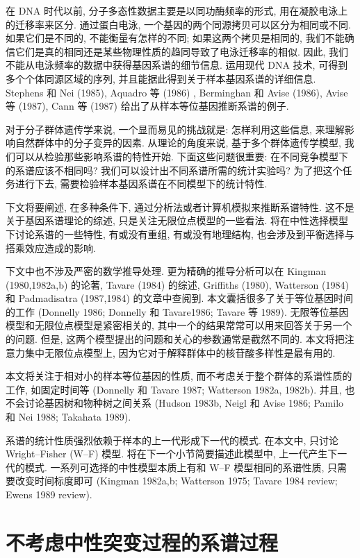 \documentclass[12pt]{article}
\begin{document}
在 DNA 时代以前, 分子多态性数据主要是以同功酶频率的形式, 用在凝胶电泳上的迁移率来区分. 通过蛋白电泳,
一个基因的两个同源拷贝可以区分为相同或不同. 如果它们是不同的, 不能衡量有怎样的不同; 如果这两个拷贝是相同的,
我们不能确信它们是真的相同还是某些物理性质的趋同导致了电泳迁移率的相似. 因此,
我们不能从电泳频率的数据中获得基因系谱的细节信息. 运用现代 DNA 技术, 可得到多个个体同源区域的序列,
并且能据此得到关于样本基因系谱的详细信息. Stephens 和 Nei (1985), Aquadro 等 (1986) , Berminghan 和 Avise
(1986), Avise 等 (1987), Cann 等 (1987) 给出了从样本等位基因推断系谱的例子.

对于分子群体遗传学来说, 一个显而易见的挑战就是: 怎样利用这些信息, 来理解影响自然群体中的分子变异的因素. 从理论的角度来说,
基于多个群体遗传学模型, 我们可以从检验那些影响系谱的特性开始. 下面这些问题很重要: 在不同竞争模型下的系谱应该不相同吗?
我们可以设计出不同系谱所需的统计实验吗? 为了把这个任务进行下去, 需要检验样本基因系谱在不同模型下的统计特性.

下文将要阐述, 在多种条件下, 通过分析法或者计算机模拟来推断系谱特性. 这不是关于基因系谱理论的综述, 只是关注无限位点模型的一些看法.
将在中性选择模型下讨论系谱的一些特性, 有或没有重组, 有或没有地理结构, 也会涉及到平衡选择与搭乘效应造成的影响.

下文中也不涉及严密的数学推导处理. 更为精确的推导分析可以在 Kingman (1980,1982a,b) 的论著, Tavare (1984) 的综述,
Griffiths (1980), Watterson (1984) 和 Padmadisatra (1987,1984) 的文章中查阅到.
本文囊括很多了关于等位基因时间的工作 (Donnelly 1986; Donnelly 和 Tavare1986; Tavare 等 1989).
无限等位基因模型和无限位点模型是紧密相关的, 其中一个的结果常常可以用来回答关于另一个的问题. 但是,
这两个模型提出的问题和关心的参数通常是截然不同的. 本文将把注意力集中无限位点模型上,
因为它对于解释群体中的核苷酸多样性是最有用的.

本文将关注于相对小的样本等位基因的性质, 而不考虑关于整个群体的系谱性质的工作, 如固定时间等 (Donnelly 和 Tavare 1987;
Watterson 1982a, 1982b). 并且, 也不会讨论基因树和物种树之间关系 (Hudson 1983b, Neigl 和 Avise 1986; Pamilo
和 Nei 1988; Takahata 1989).

系谱的统计性质强烈依赖于样本的上一代形成下一代的模式. 在本文中, 只讨论 Wright--Fisher (W--F) 模型.
将在下一个小节简要描述此模型中, 上一代产生下一代的模式. 一系列可选择的中性模型本质上有和 W--F 模型相同的系谱性质,
只需要改变时间标度即可 (Kingman 1982a,b; Watterson 1975; Tavare 1984 review; Ewens 1989 review).

\section{不考虑中性突变过程的系谱过程}
\end{document}
